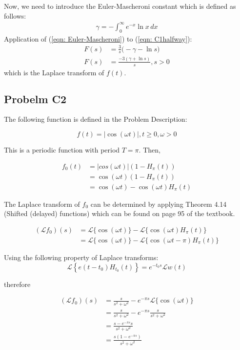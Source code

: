 \documentclass[a4paper,10pt,reqno]{amsart}
\numberwithin{equation}{section}
\newcommand{\lap}{\mathscr{L}}
\begin{document}
Now, we need to introduce the Euler-Mascheroni constant which is defined as follows:
\begin{align}
\gamma = -\int_{0}^{\infty} e^{-x} \ln x \,dx \label{eqn: Euler-Mascheroni}
\end{align}
Application of (\ref{eqn: Euler-Mascheroni}) to (\ref{eqn: C1halfway}):
\begin{align}
F(s) &= \frac{3}{s} \bigg( -\gamma - \ln s \bigg) \nonumber \\
F(s) &= \frac{-3(\gamma + \ln s)}{s}, s>0 \label{eqn: C1final}
\end{align}
which is the Laplace transform of $f(t)$.


\subsection{Probelm C2}\label{sec:c2}

The following function is defined in the Problem Description:

\begin{equation}
    f(t) = |\cos(\omega t)|, t \geq 0, \omega > 0
\end{equation}

This is a periodic function with period $T = \pi$. Then, 

\begin{align}
f_0(t) &= |cos(\omega t)|(1 - H_\pi(t)) \\
&= \cos(\omega t)(1 - H_\pi(t)) \\
&= \cos(\omega t) - \cos(\omega t)H_\pi(t)
\end{align}

The Laplace transform of $f_0$ can be determined by applying Theorem 4.14 (Shifted (delayed) functions) which can be found on page 95 of the textbook.

\begin{align}
(\lap f_0)(s) &= \lap\{\cos(\omega t)\} - \lap\{\cos(\omega t)H_\pi(t)\} \\
&= \lap\{\cos(\omega t)\} - \lap\{\cos(\omega t - \pi)H_\pi(t)\}
\end{align}

Using the following property of Laplace transforms:
\begin{equation}
    \lap\left\{e(t - t_0)H_{t_0}(t)\right\} = e^{-t_0 s}\lap{w(t)}
\end{equation}

therefore

\begin{align}
     (\lap f_0)(s) &= \frac{s}{s^2 + \omega^2} - e^{-\pi s}\lap\{\cos(\omega t)\} \\
     &= \frac{s}{s^2 + \omega^2} - e^{-\pi s}\frac{s}{s^2 + \omega^2} \\
     &= \frac{s - e^{-\pi s}s}{s^2 + \omega^2} \\
     &= \frac{s(1 - e^{-\pi s})}{s^2 + \omega^2}
\end{align}
\end{document}
